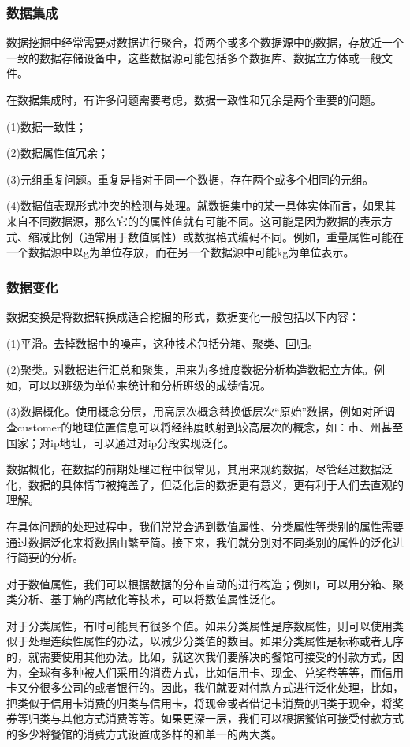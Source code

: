\subsubsection{数据集成}

数据挖掘中经常需要对数据进行聚合，将两个或多个数据源中的数据，存放近一个一致的数据存储设备中，这些数据源可能包括多个数据库、数据立方体或一般文件。

在数据集成时，有许多问题需要考虑，数据一致性和冗余是两个重要的问题。

(1)数据一致性；

(2)数据属性值冗余；

(3)元组重复问题。重复是指对于同一个数据，存在两个或多个相同的元组。

(4)数据值表现形式冲突的检测与处理。就数据集中的某一具体实体而言，如果其来自不同数据源，那么它的的属性值就有可能不同。这可能是因为数据的表示方式、缩减比例（通常用于数值属性）或数据格式编码不同。例如，重量属性可能在一个数据源中以g为单位存放，而在另一个数据源中可能kg为单位表示。

\subsubsection{数据变化}
数据变换是将数据转换成适合挖掘的形式，数据变化一般包括以下内容： 

(1)平滑。去掉数据中的噪声，这种技术包括分箱、聚类、回归。

(2)聚类。对数据进行汇总和聚集，用来为多维度数据分析构造数据立方体。例如，可以以班级为单位来统计和分析班级的成绩情况。
 
 (3)数据概化。使用概念分层，用高层次概念替换低层次“原始”数据，例如对所调查customer的地理位置信息可以将经纬度映射到较高层次的概念，如：市、州甚至国家；对ip地址，可以通过对ip分段实现泛化。
 
 数据概化，在数据的前期处理过程中很常见，其用来规约数据，尽管经过数据泛化，数据的具体情节被掩盖了，但泛化后的数据更有意义，更有利于人们去直观的理解。
 
 在具体问题的处理过程中，我们常常会遇到数值属性、分类属性等类别的属性需要通过数据泛化来将数据由繁至简。接下来，我们就分别对不同类别的属性的泛化进行简要的分析。
 
 对于数值属性，我们可以根据数据的分布自动的进行构造；例如，可以用分箱、聚类分析、基于熵的离散化等技术，可以将数值属性泛化。
 
 对于分类属性，有时可能具有很多个值。如果分类属性是序数属性，则可以使用类似于处理连续性属性的办法，以减少分类值的数目。如果分类属性是标称或者无序的，就需要使用其他办法。比如，就这次我们要解决的餐馆可接受的付款方式，因为，全球有多种被人们采用的消费方式，比如信用卡、现金、兑奖卷等等，而信用卡又分很多公司的或者银行的。因此，我们就要对付款方式进行泛化处理，比如，把类似于信用卡消费的归类与信用卡，将现金或者借记卡消费的归类于现金，将奖券等归类与其他方式消费等等。如果更深一层，我们可以根据餐馆可接受付款方式的多少将餐馆的消费方式设置成多样的和单一的两大类。
 
